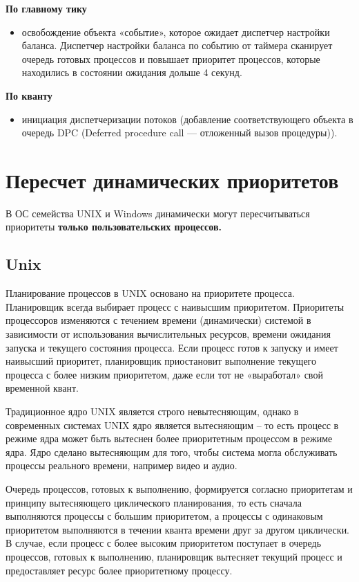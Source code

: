 \documentclass[a4paper,14pt,russian]{extreport}
\begin{document}
	\textbf{По главному тику}
	\begin{itemize}
		\item освобождение объекта «событие», которое ожидает диспетчер настройки баланса. Диспетчер настройки баланса по событию от таймера сканирует очередь готовых процессов и повышает приоритет процессов, которые находились в состоянии ожидания дольше 4 секунд.
	\end{itemize}

	\textbf{По кванту}
	\begin{itemize}
		\item инициация диспетчеризации потоков (добавление соответствующего объекта в очередь DPC (Deferred procedure call — отложенный вызов процедуры)).
	\end{itemize}

	\chapter{Пересчет динамических приоритетов}
	В ОС семейства UNIX и Windows динамически могут пересчитываться приоритеты \textbf{только пользовательских процессов.}
	
	\section{Unix}
	Планирование процессов в UNIX основано на приоритете процесса.
	Планировщик всегда выбирает процесс с наивысшим приоритетом.
	Приоритеты процессоров изменяются с течением времени (динамически) системой в зависимости от использования вычислительных ресурсов, времени ожидания запуска и текущего состояния процесса.
	Если процесс готов к запуску и имеет наивысший приоритет, планировщик приостановит выполнение текущего процесса с более низким приоритетом, даже если тот не «выработал» свой временной квант.
	
	Традиционное ядро UNIX является строго невытесняющим, однако в современных системах UNIX ядро является вытесняющим – то есть процесс в режиме ядра может быть вытеснен более приоритетным процессом в режиме ядра.
	Ядро сделано вытесняющим для того, чтобы система могла обслуживать процессы реального времени, например видео и аудио.
	
	Очередь процессов, готовых к выполнению, формируется согласно приоритетам и принципу вытесняющего циклического планирования, то есть сначала выполняются процессы с большим приоритетом, а процессы с одинаковым приоритетом выполняются в течении кванта времени друг за другом циклически.
	В случае, если процесс с более высоким приоритетом поступает в очередь процессов, готовых к выполнению, планировщик вытесняет текущий процесс и предоставляет ресурс более приоритетному процессу.
	
\end{document}
